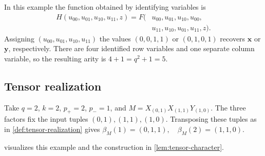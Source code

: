 \documentclass[11pt,letterpaper,onecolumn]{article}
\theoremstyle{plain}
\theoremstyle{definition}
\theoremstyle{remark}
\begin{document}
In this example the function obtained by identifying variables is
\[
\begin{aligned}
  H(u_{00},u_{01},u_{10},u_{11},z)
   =F(&u_{00},u_{01},u_{10},u_{00},\\[-2pt]
      &u_{11},u_{10},u_{01},u_{11},z).
\end{aligned}
\]
Assigning $(u_{00},u_{01},u_{10},u_{11})$ the values $(0,0,1,1)$ or
$(0,1,0,1)$ recovers $\mathbf x$ or $\mathbf y$, respectively.
There are four identified row variables and one separate column
variable, so the resulting arity is $4+1=q^2+1=5$.

\subsection{Tensor realization}
\label{app:tensor-realization-example}

Take $q=2$, $k=2$, $p_+=2$, $p_-=1$, and $M=X_{(0,1)}X_{(1,1)}Y_{(1,0)}$. The three factors fix the input tuples $(0,1),(1,1),(1,0)$.
Transposing these tuples as in \cref{def:tensor-realization} gives $\beta_M(1)=(0,1,1), \quad \beta_M(2)=(1,1,0)$.

 visualizes this example and the
construction in \cref{lem:tensor-character}.
\end{document}
